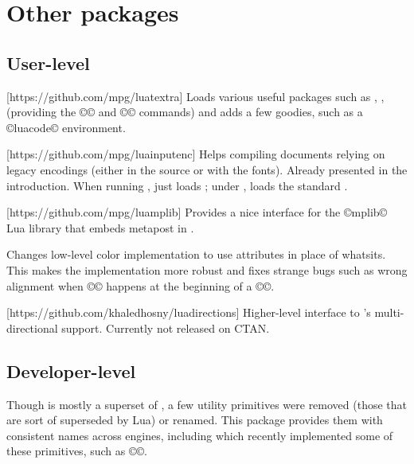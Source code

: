 \documentclass{lltxdoc}
\begin{document}

\section{Other packages}\label{other}

\subsection{User-level}

[https://github.com/mpg/luatextra]
Loads various useful packages such as , ,
 (providing the ©\LuaTeX© and ©\LuaLaTeX© commands) and adds a
few goodies, such as a ©luacode© environment.

[https://github.com/mpg/luainputenc]
Helps compiling documents relying on legacy encodings (either in the source or
with the fonts). Already presented in the introduction. When running \xetex,
just loads ; under \pdftex, loads the standard
.

[https://github.com/mpg/luamplib]
Provides a nice interface for the ©mplib© Lua library that embeds metapost in
\luatex.

Changes low-level color implementation to use \luatex attributes in place of
whatsits. This makes the implementation more robust and fixes strange bugs
such as wrong alignment when ©\color© happens at the beginning of a ©\vbox©.

[https://github.com/khaledhosny/luadirections]
Higher-level interface to \luatex's multi-directional support. Currently not
released on CTAN.

\subsection{Developer-level}

Though \luatex is mostly a superset of \pdftex, a few utility primitives were
removed (those that are sort of superseded by Lua) or renamed. This package
provides them with consistent names across engines, including \xetex which
recently implemented some of these primitives, such as ©\strcmp©.
\end{document}
